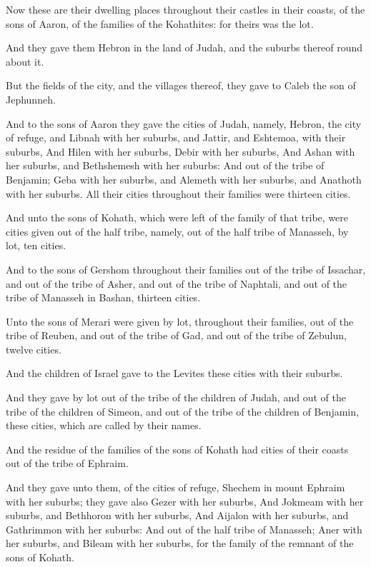 \verse Now these are their dwelling places throughout their castles in their coasts, of the sons of Aaron, of the families of the Kohathites: for theirs was the lot.

\verse And they gave them Hebron in the land of Judah, and the suburbs thereof round about it.

\verse But the fields of the city, and the villages thereof, they gave to Caleb the son of Jephunneh.

\verse And to the sons of Aaron they gave the cities of Judah, namely, Hebron, the city of refuge, and Libnah with her suburbs, and Jattir, and Eshtemoa, with their suburbs, \verse And Hilen with her suburbs, Debir with her suburbs, \verse And Ashan with her suburbs, and Bethshemesh with her suburbs: \verse And out of the tribe of Benjamin; Geba with her suburbs, and Alemeth with her suburbs, and Anathoth with her suburbs. All their cities throughout their families were thirteen cities.

\verse And unto the sons of Kohath, which were left of the family of that tribe, were cities given out of the half tribe, namely, out of the half tribe of Manasseh, by lot, ten cities.

\verse And to the sons of Gershom throughout their families out of the tribe of Issachar, and out of the tribe of Asher, and out of the tribe of Naphtali, and out of the tribe of Manasseh in Bashan, thirteen cities.

\verse Unto the sons of Merari were given by lot, throughout their families, out of the tribe of Reuben, and out of the tribe of Gad, and out of the tribe of Zebulun, twelve cities.

\verse And the children of Israel gave to the Levites these cities with their suburbs.

\verse And they gave by lot out of the tribe of the children of Judah, and out of the tribe of the children of Simeon, and out of the tribe of the children of Benjamin, these cities, which are called by their names.

\verse And the residue of the families of the sons of Kohath had cities of their coasts out of the tribe of Ephraim.

\verse And they gave unto them, of the cities of refuge, Shechem in mount Ephraim with her suburbs; they gave also Gezer with her suburbs, \verse And Jokmeam with her suburbs, and Bethhoron with her suburbs, \verse And Aijalon with her suburbs, and Gathrimmon with her suburbs: \verse And out of the half tribe of Manasseh; Aner with her suburbs, and Bileam with her suburbs, for the family of the remnant of the sons of Kohath.

